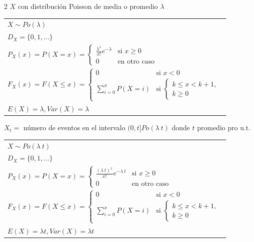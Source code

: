\documentclass[10pt,a4paper]{article}
\begin{document}
\begin{tcolorbox}[title=Poisson, equal height group=DN4]
    \begin{multicols}{2}
        $X$ con distribución Poisson de media o promedio $\lambda$
        \begin{tabular}{l}
            $X \sim Po(\lambda)$ \\
            $D_X = \{0,1,\ldots\}$ \\
            $P_X(x) = P(X = x) = \begin{cases} \frac{\lambda^x}{x!}e^{-\lambda} & \text{si } x \geq 0 \\ 0 & \text{en otro caso}\end{cases}$ \\
            $F_X(x) = F(X \leq x) = \begin{cases} 0 & \text{si } x < 0 \\ \sum\limits_{i=0}^{x} P(X=i) & \text{si } \begin{cases} k \leq x < k + 1, \\ k \geq 0 \end{cases}\end{cases}$ \\
            $E(X) = \lambda, Var(X) = \lambda$
        \end{tabular}

        \columnbreak

        $X_t = $ número de eventos en el intervalo $(0, t] Po(\lambda\ t)$ donde $t$ promedio pro u.t.

        \begin{tabular}{l}
            $X \sim Po(\lambda\ t)$ \\
            $D_X = \{0,1,\ldots\}$ \\
            $P_X(x) = P(X = x) = \begin{cases} \frac{(\lambda\ t)^x}{x!}e^{-\lambda\ t} & \text{si } x \geq 0 \\ 0 & \text{en otro caso}\end{cases}$ \\
            $F_X(x) = F(X \leq x) = \begin{cases} 0 & \text{si } x < 0 \\ \sum\limits_{i=0}^{x} P(X=i) & \text{si } \begin{cases} k \leq x < k + 1, \\ k \geq 0 \end{cases}\end{cases}$ \\
            $E(X) = \lambda t, Var(X) = \lambda t$
        \end{tabular}
    \end{multicols}
    \vspace*{5pt}
\end{tcolorbox}
\end{document}
